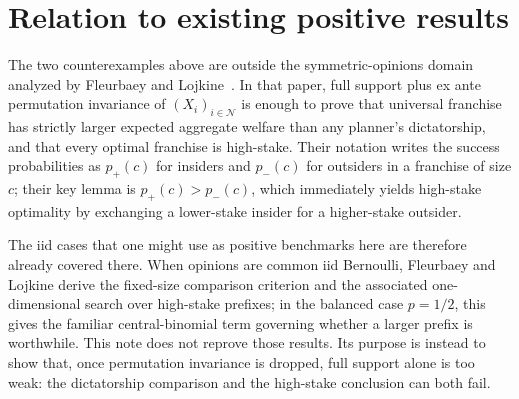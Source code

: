 \documentclass{article}
\theoremstyle{plain}
\theoremstyle{definition}
\newcommand{\N}{\mathcal{N}}
\begin{document}
\section{Relation to existing positive results}\label{sec:positive}

The two counterexamples above are outside the symmetric-opinions domain analyzed by Fleurbaey and Lojkine~\cite{fleurbaey-lojkine}.  In that paper, full support plus ex ante permutation invariance of $(X_i)_{i \in \N}$ is enough to prove that universal franchise has strictly larger expected aggregate welfare than any planner's dictatorship, and that every optimal franchise is high-stake.  Their notation writes the success probabilities as $p_+(c)$ for insiders and $p_-(c)$ for outsiders in a franchise of size $c$; their key lemma is $p_+(c) > p_-(c)$, which immediately yields high-stake optimality by exchanging a lower-stake insider for a higher-stake outsider.

The iid cases that one might use as positive benchmarks here are therefore already covered there.  When opinions are common iid Bernoulli, Fleurbaey and Lojkine derive the fixed-size comparison criterion and the associated one-dimensional search over high-stake prefixes; in the balanced case $p=1/2$, this gives the familiar central-binomial term governing whether a larger prefix is worthwhile.  This note does not reprove those results.  Its purpose is instead to show that, once permutation invariance is dropped, full support alone is too weak: the dictatorship comparison and the high-stake conclusion can both fail.
\end{document}
